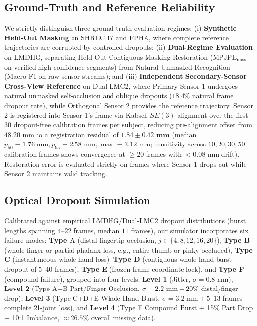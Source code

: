 \documentclass[10pt,twocolumn]{article}
\begin{document}
\subsection{Ground-Truth and Reference Reliability}
We strictly distinguish three ground-truth evaluation regimes: (i) \textbf{Synthetic Held-Out Masking} on SHREC'17 and FPHA, where complete reference trajectories are corrupted by controlled dropouts; (ii) \textbf{Dual-Regime Evaluation} on LMDHG, separating Held-Out Contiguous Masking Restoration ($\text{MPJPE}_{\text{miss}}$ on verified high-confidence segments) from Natural Unmasked Recognition (Macro-F1 on raw sensor streams); and (iii) \textbf{Independent Secondary-Sensor Cross-View Reference} on Dual-LMC2, where Primary Sensor 1 undergoes natural unmasked self-occlusion and oblique dropouts ($18.4\%$ natural frame dropout rate), while Orthogonal Sensor 2 provides the reference trajectory. Sensor 2 is registered into Sensor 1's frame via Kabsch $SE(3)$ alignment over the first $30$ dropout-free calibration frames per subject, reducing pre-alignment offset from $48.20\text{ mm}$ to a registration residual of $\mathbf{1.84 \pm 0.42\text{ mm}}$ (median $p_{50}=1.76\text{ mm}, p_{95}=2.58\text{ mm}, \max=3.12\text{ mm}$; sensitivity across $10, 20, 30, 50$ calibration frames shows convergence at $\ge 20$ frames with $<0.08\text{ mm}$ drift). Restoration error is evaluated strictly on frames where Sensor 1 drops out while Sensor 2 maintains valid tracking.

\subsection{Optical Dropout Simulation}
Calibrated against empirical LMDHG/Dual-LMC2 dropout distributions (burst lengths spanning $4\text{--}22$ frames, median $11$ frames), our simulator incorporates six failure modes: \textbf{Type A} (distal fingertip occlusion, $j \in \{4,8,12,16,20\}$), \textbf{Type B} (whole-finger or partial phalanx loss, e.g., entire thumb or pinky occluded), \textbf{Type C} (instantaneous whole-hand loss), \textbf{Type D} (contiguous whole-hand burst dropout of $5\text{--}40$ frames), \textbf{Type E} (frozen-frame coordinate lock), and \textbf{Type F} (compound failure), grouped into four levels: \textbf{Level 1} (Jitter, $\sigma=0.8\text{ mm}$), \textbf{Level 2} (Type A+B Part/Finger Occlusion, $\sigma=2.2\text{ mm} + 20\%$ distal/finger drop), \textbf{Level 3} (Type C+D+E Whole-Hand Burst, $\sigma=3.2\text{ mm} + 5\text{--}13$ frames complete 21-joint loss), and \textbf{Level 4} (Type F Compound Burst + 15\% Part Drop + 10:1 Imbalance, $\approx 26.5\%$ overall missing data).
\end{document}
